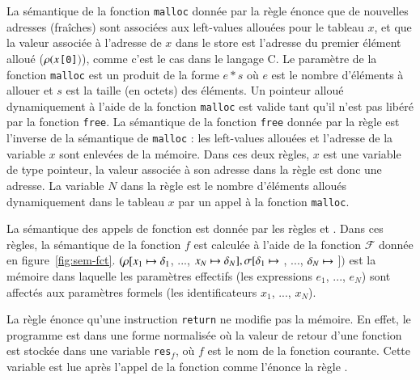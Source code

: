 La sémantique de la fonction \lstinline'malloc' donnée par la règle
 énonce que de nouvelles adresses (fraîches) sont associées
aux left-values allouées pour le tableau $x$, et que la valeur
associée à l'adresse de $x$ dans le store est l'adresse du premier
élément alloué ($\rho(x$\lstinline'[0]'$)$), comme c'est le cas dans le langage
C.
Le paramètre de la fonction \lstinline'malloc' est un produit de la forme
$e*s$ où $e$ est le nombre d'éléments à allouer et $s$ est la taille (en octets)
des éléments.
Un pointeur alloué dynamiquement à l'aide de la fonction \lstinline'malloc' est
valide tant qu'il n'est pas libéré par la fonction \lstinline'free'.
La sémantique de la fonction \lstinline'free' donnée par la règle
 est l'inverse de la sémantique de \lstinline'malloc' : les
left-values allouées et l'adresse de la variable $x$ sont enlevées de la
mémoire.
Dans ces deux règles, $x$ est une variable de type pointeur, la
valeur associée à son adresse dans la règle  est donc une
adresse.
La variable $N$ dans la règle  est le nombre d'éléments alloués
dynamiquement dans le tableau $x$ par un appel à la fonction \lstinline'malloc'.

La sémantique des appels de fonction est donnée par les règles 
et .
Dans ces règles, la sémantique de la fonction $f$ est calculée à
l'aide de la fonction $\mathcal{F}$ donnée en figure~\ref{fig:sem-fct}.
$(\rho[x_1 \mapsto \delta_1$, ...,
  $x_N \mapsto \delta_N], \sigma[\delta_1 \mapsto$
  , ...,
  $\delta_N \mapsto$  $])$
est la mémoire dans laquelle les paramètres effectifs (les expressions
$e_1$, ..., $e_N$) sont affectés aux paramètres formels (les identificateurs
$x_1$, ..., $x_N$).


La règle  énonce qu'une instruction \lstinline'return' ne
modifie pas la mémoire.
En effet, le programme est dans une forme normalisée où la valeur de retour
d'une fonction est stockée dans une variable \lstinline'res'$_f$, où
$f$ est le nom de la fonction courante.
Cette variable est lue après l'appel de la fonction comme l'énonce la règle
.

